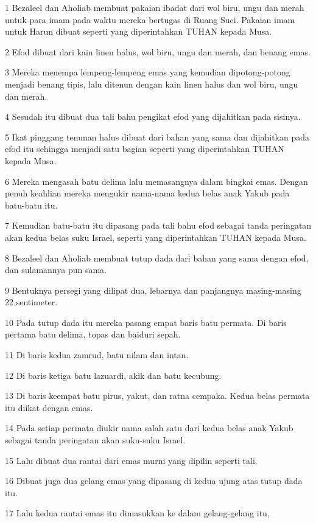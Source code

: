 \par 1 Bezaleel dan Aholiab membuat pakaian ibadat dari wol biru, ungu dan merah untuk para imam pada waktu mereka bertugas di Ruang Suci. Pakaian imam untuk Harun dibuat seperti yang diperintahkan TUHAN kepada Musa.
\par 2 Efod dibuat dari kain linen halus, wol biru, ungu dan merah, dan benang emas.
\par 3 Mereka menempa lempeng-lempeng emas yang kemudian dipotong-potong menjadi benang tipis, lalu ditenun dengan kain linen halus dan wol biru, ungu dan merah.
\par 4 Sesudah itu dibuat dua tali bahu pengikat efod yang dijahitkan pada sisinya.
\par 5 Ikat pinggang tenunan halus dibuat dari bahan yang sama dan dijahitkan pada efod itu sehingga menjadi satu bagian seperti yang diperintahkan TUHAN kepada Musa.
\par 6 Mereka mengasah batu delima lalu memasangnya dalam bingkai emas. Dengan penuh keahlian mereka mengukir nama-nama kedua belas anak Yakub pada batu-batu itu.
\par 7 Kemudian batu-batu itu dipasang pada tali bahu efod sebagai tanda peringatan akan kedua belas suku Israel, seperti yang diperintahkan TUHAN kepada Musa.
\par 8 Bezaleel dan Aholiab membuat tutup dada dari bahan yang sama dengan efod, dan sulamannya pun sama.
\par 9 Bentuknya persegi yang dilipat dua, lebarnya dan panjangnya masing-masing 22 sentimeter.
\par 10 Pada tutup dada itu mereka pasang empat baris batu permata. Di baris pertama batu delima, topas dan baiduri sepah.
\par 11 Di baris kedua zamrud, batu nilam dan intan.
\par 12 Di baris ketiga batu lazuardi, akik dan batu kecubung.
\par 13 Di baris keempat batu pirus, yakut, dan ratna cempaka. Kedua belas permata itu diikat dengan emas.
\par 14 Pada setiap permata diukir nama salah satu dari kedua belas anak Yakub sebagai tanda peringatan akan suku-suku Israel.
\par 15 Lalu dibuat dua rantai dari emas murni yang dipilin seperti tali.
\par 16 Dibuat juga dua gelang emas yang dipasang di kedua ujung atas tutup dada itu.
\par 17 Lalu kedua rantai emas itu dimasukkan ke dalam gelang-gelang itu,
